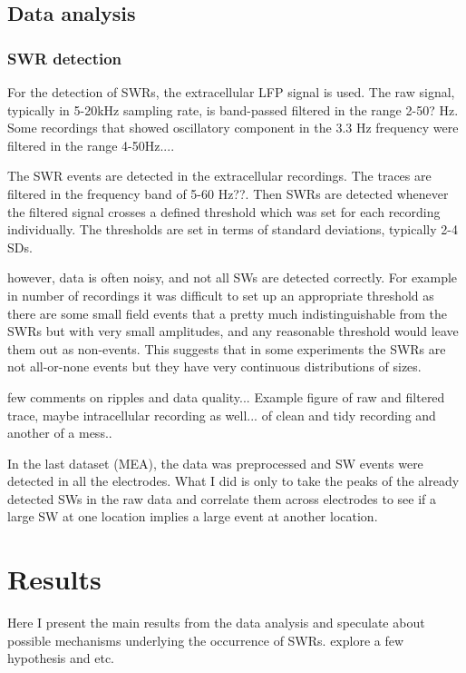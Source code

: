   \subsection{Data analysis}
    \subsubsection{SWR detection}
      For the detection of SWRs, the extracellular LFP signal is used. The raw
      signal, typically in 5-20kHz sampling rate, is band-passed filtered in
      the range 2-50? Hz. Some recordings that showed oscillatory component in
      the 3.3 Hz frequency were filtered in the range 4-50Hz.... 

    The SWR events are detected in the extracellular recordings.
    The traces are filtered in the frequency band of 5-60 Hz??.
    Then SWRs are detected whenever the filtered signal crosses a defined threshold which was set for each recording individually.
    The thresholds are set in terms of standard deviations, typically 2-4 SDs.

    however, data is often noisy, and not all SWs are detected correctly.
    For example in number of recordings it was difficult to set up an appropriate threshold as there are some small field events that a pretty much indistinguishable from the SWRs but with very small amplitudes, and any reasonable threshold would leave them out as non-events. This suggests that in some experiments the SWRs are not all-or-none events but they have very continuous distributions of sizes.

    few comments on ripples and data quality...
    Example figure of raw and filtered trace, maybe intracellular recording as well...
    of clean and tidy recording and another of a mess..

    In the last dataset (MEA), the data was preprocessed and SW events were detected in all the electrodes.
    What I did is only to take the peaks of the already detected SWs in the raw data and correlate them across electrodes to see if a large SW at one location implies a large event at another location.
    
\section{Results}

  Here I present the main results from the data analysis and speculate about
  possible mechanisms underlying the occurrence of SWRs. explore a few hypothesis and etc.

